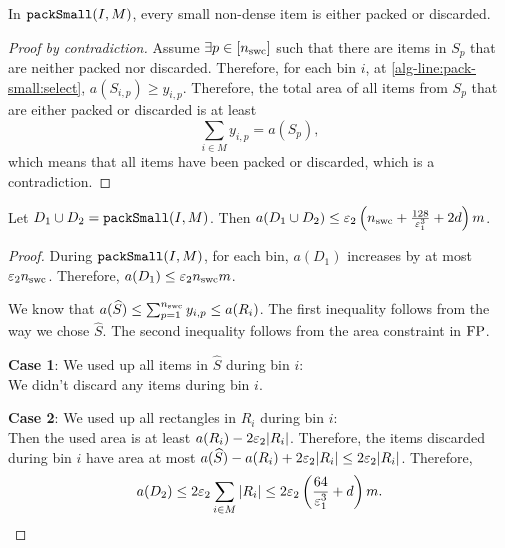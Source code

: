 \begin{lemma}
In $\operatorname{\mathtt{packSmall}}(I, M)$, every small non-dense item is either packed or discarded.
\end{lemma}
\begin{proof}[Proof by contradiction]
Assume $\exists p \in [n_{\mathrm{swc}}]$ such that there are items in $S_p$
that are neither packed nor discarded.
Therefore, for each bin $i$, at \cref{alg-line:pack-small:select},
$a(S_{i,p}) \ge y_{i,p}$. Therefore, the total area of all items from $S_p$
that are either packed or discarded is at least
\[ \sum_{i \in M} y_{i,p} = a(S_p),  \tag{by conservation constraint in $\FP$} \]
which means that all items have been packed or discarded, which is a contradiction.
\end{proof}

\begin{lemma}
Let $D_1 \cup D_2 = \operatorname{\mathtt{packSmall}}(I, M)$. Then
$a(D_1 \cup D_2) \le \varepsilon_2\left(n_{\mathrm{swc}} + \frac{128}{\varepsilon_1^3} + 2d\right) m$.
\end{lemma}
\begin{proof}
During $\operatorname{\mathtt{packSmall}}(I, M)$, for each bin, $a(D_1)$ increases by at most $\varepsilon_2 n_{\mathrm{swc}}$.
Therefore, $a(D_1) \le \varepsilon_2 n_{\mathrm{swc}} m$.

We know that $a(\widehat{S}) \le \sum_{p=1}^{n_{\mathrm{swc}}} y_{i,p} \le a(R_i)$.
The first inequality follows from the way we chose $\widehat{S}$.
The second inequality follows from the area constraint in $\operatorname{FP}$.

\textbf{Case 1}: We used up all items in $\widehat{S}$ during bin $i$:\\
We didn't discard any items during bin $i$.

\textbf{Case 2}: We used up all rectangles in $R_i$ during bin $i$:\\
Then the used area is at least $a(R_i) - 2\varepsilon_2|R_i|$.
Therefore, the items discarded during bin $i$ have area at most
$a(\widehat{S}) - a(R_i) + 2\varepsilon_2|R_i| \le 2\varepsilon_2|R_i|$.
Therefore,
\[ a(D_2) \le 2\varepsilon_2\sum_{i \in M}|R_i|
\le 2\varepsilon_2\left(\frac{64}{\varepsilon_1^3} + d\right) m \qedhere. \]
\end{proof}

